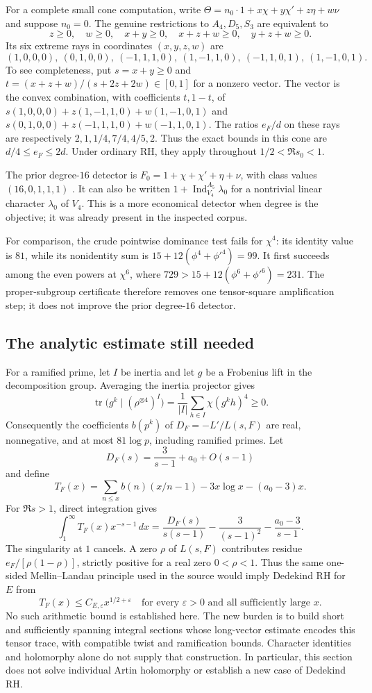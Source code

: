 For a complete small cone computation, write
$\Theta=n_0\cdot1+x\chi+y\chi'+z\eta+w\nu$ and suppose $n_0=0$.
The genuine restrictions to $A_4,D_5,S_3$ are equivalent to
\[
 z\ge0,\quad w\ge0,\quad x+y\ge0,\quad x+z+w\ge0,\quad y+z+w\ge0.
\]
Its six extreme rays in coordinates $(x,y,z,w)$ are
\[
 (1,0,0,0),\ (0,1,0,0),\ (-1,1,1,0),\ (1,-1,1,0),\
 (-1,1,0,1),\ (1,-1,0,1).
\]
To see completeness, put $s=x+y\ge0$ and
$t=(x+z+w)/(s+2z+2w)\in[0,1]$ for a nonzero vector. The vector is the
convex combination, with coefficients $t,1-t$, of
$s(1,0,0,0)+z(1,-1,1,0)+w(1,-1,0,1)$ and
$s(0,1,0,0)+z(-1,1,1,0)+w(-1,1,0,1)$.
The ratios $e_F/d$ on these rays are respectively
$2,1,1/4,7/4,4/5,2$. Thus the exact bounds in this cone are
$d/4\le e_F\le2d$. Under ordinary RH, they apply throughout
$1/2<\Re s_0<1$.

The prior degree-$16$ detector is $F_0=1+\chi+\chi'+\eta+\nu$,
with class values $(16,0,1,1,1)$ \cite{pslprior}. It can also be written
$1+\operatorname{Ind}_{V_4}^{A_5}\lambda_0$ for a nontrivial linear
character $\lambda_0$ of $V_4$. This is a more economical detector when
degree is the objective; it was already present in the inspected corpus.

For comparison, the crude pointwise dominance test fails for $\chi^4$:
its identity value is $81$, while its nonidentity sum is
$15+12(\phi^4+\phi'^4)=99$. It first succeeds among the even powers at
$\chi^6$, where $729>15+12(\phi^6+\phi'^6)=231$.
The proper-subgroup certificate therefore removes one tensor-square
amplification step; it does not improve the prior degree-$16$ detector.

\subsection{The analytic estimate still needed}
For a ramified prime, let $I$ be inertia and let $g$ be a Frobenius lift in
the decomposition group. Averaging the inertia projector gives
\[
 \operatorname{tr}\bigl(g^k\mid(\rho^{\otimes4})^I\bigr)
 =\frac1{|I|}\sum_{h\in I}\chi(g^kh)^4\ge0.
\]
Consequently the coefficients $b(p^k)$ of $D_F=-L'/L(s,F)$ are real,
nonnegative, and at most $81\log p$, including ramified primes. Let
\[
 D_F(s)=\frac3{s-1}+a_0+O(s-1)
\]
and define
\[
 T_F(x)=\sum_{n\le x}b(n)(x/n-1)-3x\log x-(a_0-3)x.
\]
For $\Re s>1$, direct integration gives
\[
 \int_1^\infty T_F(x)x^{-s-1}\,dx
 =\frac{D_F(s)}{s(s-1)}-\frac3{(s-1)^2}-\frac{a_0-3}{s-1}.
\]
The singularity at $1$ cancels. A zero $\rho$ of $L(s,F)$ contributes
residue $e_F/[\rho(1-\rho)]$, strictly positive for a real zero
$0<\rho<1$. Thus the same one-sided Mellin--Landau principle used in the
source would imply Dedekind RH for $E$ from
\[
 T_F(x)\le C_{E,\varepsilon}x^{1/2+\varepsilon}
 \quad\text{for every }\varepsilon>0\text{ and all sufficiently large }x.
\]
No such arithmetic bound is established here. The new burden is to build
short and sufficiently spanning integral sections whose long-vector
estimate encodes this tensor trace, with compatible twist and
ramification bounds. Character identities and holomorphy alone do not
supply that construction. In particular, this section does not solve
individual Artin holomorphy or establish a new case of Dedekind RH.
